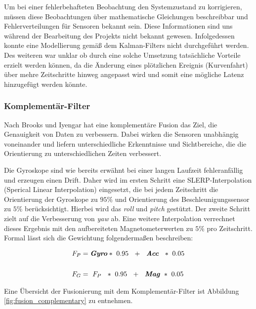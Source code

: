Um bei einer fehlerbehafteten Beobachtung den Systemzustand zu korrigieren, müssen diese Beobachtungen über mathematische Gleichungen beschreibbar und Fehlerverteilungen für Sensoren bekannt sein. Diese Informationen sind uns während der Bearbeitung des Projekts nicht bekannt gewesen.
Infolgedessen konnte eine Modellierung gemäß dem Kalman-Filters nicht durchgeführt werden. 
Des weiteren war unklar ob durch eine solche Umsetzung tatsächliche Vorteile erzielt werden können, da die Änderung eines plötzlichen Ereignis (Kurvenfahrt) über mehre Zeitschritte hinweg angepasst wird und somit eine mögliche Latenz hinzugefügt werden könnte.

\subsubsection{Komplementär-Filter}
Nach Brooks und Iyengar \cite{Brooks.1998} hat eine komplementäre Fusion das Ziel, die Genauigkeit von Daten zu verbessern. 
Dabei wirken die Sensoren unabhängig voneinander und liefern unterschiedliche Erkenntnisse und Sichtbereiche, die die Orientierung zu unterschiedlichen Zeiten verbessert.

Die Gyroskope sind wie bereits erwähnt bei einer langen Laufzeit fehleranfällig und erzeugen einen Drift. 
Daher wird im ersten Schritt eine SLERP-Interpolation (Sperical Linear Interpolation) eingesetzt, die bei jedem Zeitschritt die Orientierung der Gyroskope zu $95\%$ und Orientierung des Beschleunigungssensor zu $5\%$ berücksichtigt. Hierbei wird das \emph{roll} und \emph{pitch} gestützt. Der zweite Schritt zielt auf die Verbesserung von \emph{yaw} ab. Eine weitere Interpolation verrechnet dieses Ergebnis mit den aufbereiteten Magnetometerwerten zu $5\%$ pro Zeitschritt. Formal lässt sich die Gewichtung folgendermaßen beschreiben:

\begin{align}
F_P &= \textbf{\textit{Gyro}}*~0.95~~+~~\textbf{\textit{Acc}}~~*~0.05\\
\notag\\
F_G &= ~F_P~~*~0.95~~+~~\textbf{\textit{Mag}}~*~0.05
\end{align}


Eine Übersicht der Fusionierung mit dem Komplementär-Filter ist Abbildung \ref{fig:fusion_complementary} zu entnehmen.

